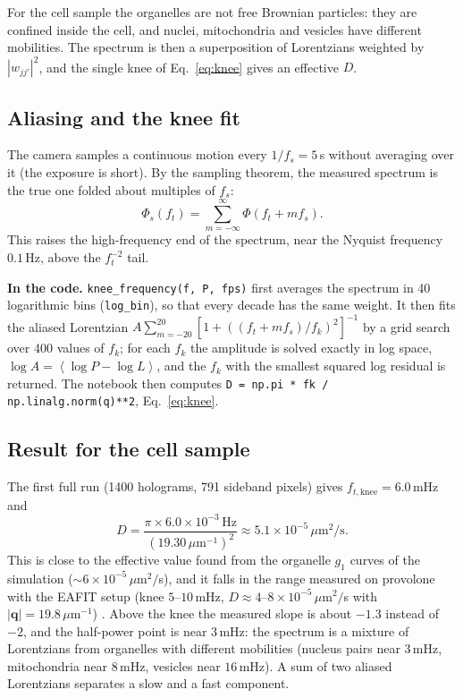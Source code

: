 \documentclass[11pt,a4paper]{article}
\newcommand{\vq}{\mathbf{q}}
\newcommand{\um}{\,\mu\mathrm{m}}
\newcommand{\avg}[1]{\left\langle #1 \right\rangle}
\newcommand{\code}[1]{\texttt{\small #1}}
\newcommand{\incode}[1]{\par\smallskip\noindent\colorbox{black!6}{\parbox{\dimexpr\linewidth-2\fboxsep}{\small\textbf{In the code.} #1}}\par\smallskip}
\begin{document}
For the cell sample the organelles are not free Brownian particles: they are
confined inside the cell, and nuclei, mitochondria and vesicles have different
mobilities. The spectrum is then a superposition of Lorentzians weighted by
$|w_{jj'}|^2$, and the single knee of Eq.~\eqref{eq:knee} gives an effective
$D$.

\subsection{Aliasing and the knee fit}
\label{sec:knee}

The camera samples a continuous motion every $1/f_s = 5\,$s without averaging
over it (the exposure is short). By the sampling theorem, the measured
spectrum is the true one folded about multiples of $f_s$:
\begin{equation}
  \Phi_s(f_t) = \sum_{m=-\infty}^{\infty}\Phi(f_t + mf_s) .
\end{equation}
This raises the high-frequency end of the spectrum, near the Nyquist
frequency $0.1\,$Hz, above the $f_t^{-2}$ tail.

\incode{\code{knee\_frequency(f, P, fps)} first averages the spectrum in 40
logarithmic bins (\code{log\_bin}), so that every decade has the same weight.
It then fits the aliased Lorentzian
$A\sum_{m=-20}^{20}[1+((f_t+mf_s)/f_k)^2]^{-1}$ by a grid search over 400
values of $f_k$; for each $f_k$ the amplitude is solved exactly in log space,
$\log A = \avg{\log P - \log L}$, and the $f_k$ with the smallest squared
log residual is returned. The notebook then computes
\code{D = np.pi * fk / np.linalg.norm(q)**2}, Eq.~\eqref{eq:knee}.}

\subsection{Result for the cell sample}

The first full run (1400 holograms, 791 sideband pixels) gives
$f_{t,\mathrm{knee}} = 6.0\,$mHz and
\begin{equation}
  D = \frac{\pi\times 6.0\times10^{-3}\,\mathrm{Hz}}{(19.30\um^{-1})^2}
  \approx 5.1\times10^{-5}\um^2/\mathrm{s}.
\end{equation}
This is close to the effective value found from the organelle $g_1$ curves of
the simulation ($\sim6\times10^{-5}\um^2/$s), and it falls in the range
measured on provolone with the EAFIT setup (knee $5$--$10\,$mHz,
$D \approx 4$--$8\times10^{-5}\um^2/$s with $|\vq| = 19.8\um^{-1}$)
\cite[\S4.2.2]{lopez2026}. Above the knee the measured slope is about $-1.3$
instead of $-2$, and the half-power point is near $3\,$mHz: the spectrum is a
mixture of Lorentzians from organelles with different mobilities (nucleus
pairs near $3\,$mHz, mitochondria near $8\,$mHz, vesicles near $16\,$mHz). A
sum of two aliased Lorentzians separates a slow and a fast component.
\end{document}
